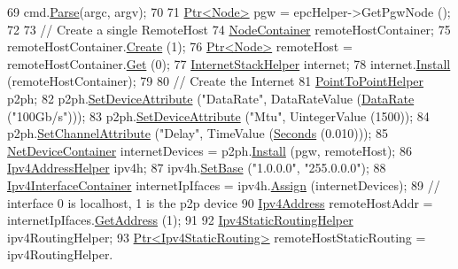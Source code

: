 \begin{DoxyCode}
69   cmd.\hyperlink{classns3_1_1CommandLine_a5c10b85b3207e5ecb48d907966923156}{Parse}(argc, argv);
70 
71   \hyperlink{classns3_1_1Ptr}{Ptr<Node>} pgw = epcHelper->GetPgwNode ();
72 
73    \textcolor{comment}{// Create a single RemoteHost}
74   \hyperlink{classns3_1_1NodeContainer}{NodeContainer} remoteHostContainer;
75   remoteHostContainer.\hyperlink{classns3_1_1NodeContainer_a787f059e2813e8b951cc6914d11dfe69}{Create} (1);
76   \hyperlink{classns3_1_1Ptr}{Ptr<Node>} remoteHost = remoteHostContainer.\hyperlink{classns3_1_1NodeContainer_a9ed96e2ecc22e0f5a3d4842eb9bf90bf}{Get} (0);
77   \hyperlink{classns3_1_1InternetStackHelper}{InternetStackHelper} internet;
78   internet.\hyperlink{classns3_1_1InternetStackHelper_a6645b412f31283d2d9bc3d8a95cebbc0}{Install} (remoteHostContainer);
79 
80   \textcolor{comment}{// Create the Internet}
81   \hyperlink{classns3_1_1PointToPointHelper}{PointToPointHelper} p2ph;
82   p2ph.\hyperlink{classns3_1_1PointToPointHelper_a4577f5ab8c387e5528af2e0fbab1152e}{SetDeviceAttribute} (\textcolor{stringliteral}{"DataRate"}, DataRateValue (\hyperlink{classns3_1_1DataRate}{DataRate} (\textcolor{stringliteral}{"100Gb/s"})));
83   p2ph.\hyperlink{classns3_1_1PointToPointHelper_a4577f5ab8c387e5528af2e0fbab1152e}{SetDeviceAttribute} (\textcolor{stringliteral}{"Mtu"}, UintegerValue (1500));
84   p2ph.\hyperlink{classns3_1_1PointToPointHelper_a6b5317fd17fb61e5a53f8d66a90b63b9}{SetChannelAttribute} (\textcolor{stringliteral}{"Delay"}, TimeValue (\hyperlink{group__timecivil_ga33c34b816f8ff6628e33d5c8e9713b9e}{Seconds} (0.010)));
85   \hyperlink{classns3_1_1NetDeviceContainer}{NetDeviceContainer} internetDevices = p2ph.\hyperlink{classns3_1_1PointToPointHelper_ab9162fea3e88722666fed1106df1f9ec}{Install} (pgw, remoteHost);
86   \hyperlink{classns3_1_1Ipv4AddressHelper}{Ipv4AddressHelper} ipv4h;
87   ipv4h.\hyperlink{classns3_1_1Ipv4AddressHelper_acf7b16dd25bac67e00f5e25f90a9a035}{SetBase} (\textcolor{stringliteral}{"1.0.0.0"}, \textcolor{stringliteral}{"255.0.0.0"});
88   \hyperlink{classns3_1_1Ipv4InterfaceContainer}{Ipv4InterfaceContainer} internetIpIfaces = ipv4h.\hyperlink{classns3_1_1Ipv4AddressHelper_af8e7f4a1a7e74c00014a1eac445a27af}{Assign} (internetDevices);
89   \textcolor{comment}{// interface 0 is localhost, 1 is the p2p device}
90   \hyperlink{classns3_1_1Ipv4Address}{Ipv4Address} remoteHostAddr = internetIpIfaces.\hyperlink{classns3_1_1Ipv4InterfaceContainer_ae63208dcd222be986822937ee4aa828c}{GetAddress} (1);
91 
92   \hyperlink{classns3_1_1Ipv4StaticRoutingHelper}{Ipv4StaticRoutingHelper} ipv4RoutingHelper;
93   \hyperlink{classns3_1_1Ptr}{Ptr<Ipv4StaticRouting>} remoteHostStaticRouting = ipv4RoutingHelper.

\end{DoxyCode}

